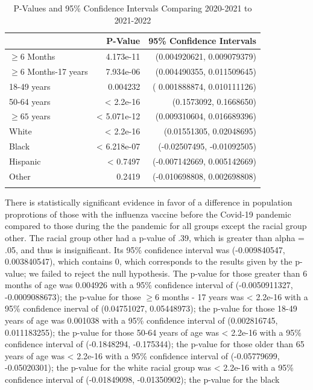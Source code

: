 \documentclass[12pt]{article}
\begin{document}
\begin{table}[ht!]
  \centering
  \caption{P-Values and 95\% Confidence Intervals Comparing 2020-2021 to 2021-2022}
  \label{tab:table:results1}
   \begin{tabularx}{.8\textwidth}{X rr}
    \lsptoprule
              &P-Value & 95\% Confidence Intervals\\
    \midrule
    $\ge 6$ Months & 4.173e-11 &  (0.004920621, 0.009079379)\\
    $\ge6$ Months-17 years  &   7.934e-06  &    (0.004490355, 0.011509645) \\
    18-49 years  &   0.004232  &    ( 0.001888874, 0.010111126)  \\
    50-64 years &   < 2.2e-16 &    (0.1573092, 0.1668650) \\
    $\ge 65$ years  &   < 5.071e-12 &  (0.009310604, 0.016689396) \\
    White & < 2.2e-16 & (0.01551305, 0.02048695) \\
    Black & < 6.218e-07 & (-0.02507495, -0.01092505) \\
    Hispanic & < 0.7497 & (-0.007142669, 0.005142669) \\
    Other & 0.2419 & (-0.010698808, 0.002698808) \\
    \lspbottomrule
   \end{tabularx}
  \end{table}
\clearpage
There is statistically significant evidence in favor of a difference in population proprotions of those with the influenza vaccine before the Covid-19
pandemic compared to those during the the pandemic for all groups except the racial group other. The racial group other had a p-value of .39, which is
greater than alpha = .05, and thus is insignificant. Its 95\% confidence interval was (-0.009840547, 0.003840547), which contains 0, which corresponds to
the results given by the p-value; we failed to reject the null hypothesis. The p-value for those greater than 6 months of age was 0.004926 with a 95\% confidence
interval of (-0.0050911327, -0.0009088673); the p-value for those $\ge 6$ months - 17 years was < 2.2e-16 with a 95\% confidence inerval of (0.04751027, 0.05448973);
the p-value for those 18-49 years of age was 0.001038 with a 95\% confidence interval of (0.002816745, 0.011183255); the p-value for those 50-64 years of age was
< 2.2e-16 with a 95\% confidence interval of (-0.1848294, -0.175344); the p-value for those older than 65 years of age was < 2.2e-16 with a 95\% confidence interval of 
(-0.05779699, -0.05020301); the p-value for the white racial group was < 2.2e-16 with a 95\% confidence interval of (-0.01849098, -0.01350902); the p-value for the black
\end{document}
